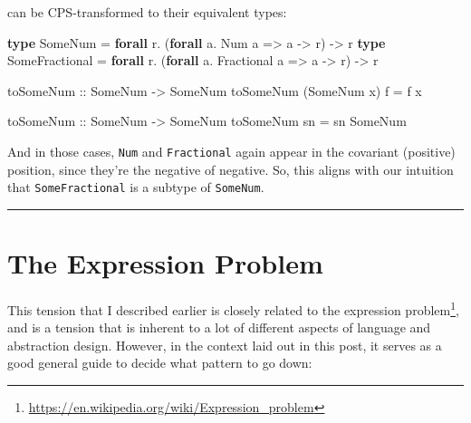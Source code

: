 \documentclass[]{article}
\newenvironment{Shaded}{}{}
\newcommand{\DataTypeTok}[1]{\textcolor[rgb]{0.56,0.13,0.00}{#1}}
\newcommand{\KeywordTok}[1]{\textcolor[rgb]{0.00,0.44,0.13}{\textbf{#1}}}
\newcommand{\NormalTok}[1]{#1}
\newcommand{\OperatorTok}[1]{\textcolor[rgb]{0.40,0.40,0.40}{#1}}
\newcommand{\OtherTok}[1]{\textcolor[rgb]{0.00,0.44,0.13}{#1}}
\renewcommand{\href}[2]{#2\footnote{\url{#1}}}
\begin{document}
can be CPS-transformed to their equivalent types:

\begin{Shaded}
\begin{Highlighting}[]
\KeywordTok{type} \DataTypeTok{SomeNum\textquotesingle{}} \OtherTok{=} \KeywordTok{forall}\NormalTok{ r}\OperatorTok{.}\NormalTok{ (}\KeywordTok{forall}\NormalTok{ a}\OperatorTok{.} \DataTypeTok{Num}\NormalTok{ a }\OtherTok{=\textgreater{}}\NormalTok{ a }\OtherTok{{-}\textgreater{}}\NormalTok{ r) }\OtherTok{{-}\textgreater{}}\NormalTok{ r}
\KeywordTok{type} \DataTypeTok{SomeFractional\textquotesingle{}} \OtherTok{=} \KeywordTok{forall}\NormalTok{ r}\OperatorTok{.}\NormalTok{ (}\KeywordTok{forall}\NormalTok{ a}\OperatorTok{.} \DataTypeTok{Fractional}\NormalTok{ a }\OtherTok{=\textgreater{}}\NormalTok{ a }\OtherTok{{-}\textgreater{}}\NormalTok{ r) }\OtherTok{{-}\textgreater{}}\NormalTok{ r}

\OtherTok{toSomeNum\textquotesingle{} ::} \DataTypeTok{SomeNum} \OtherTok{{-}\textgreater{}} \DataTypeTok{SomeNum\textquotesingle{}}
\NormalTok{toSomeNum\textquotesingle{} (}\DataTypeTok{SomeNum}\NormalTok{ x) f }\OtherTok{=}\NormalTok{ f x}

\OtherTok{toSomeNum ::} \DataTypeTok{SomeNum\textquotesingle{}} \OtherTok{{-}\textgreater{}} \DataTypeTok{SomeNum}
\NormalTok{toSomeNum sn }\OtherTok{=}\NormalTok{ sn }\DataTypeTok{SomeNum}
\end{Highlighting}
\end{Shaded}

And in those cases, \texttt{Num} and \texttt{Fractional} again appear in the
covariant (positive) position, since they're the negative of negative. So, this
aligns with our intuition that \texttt{SomeFractional} is a subtype of
\texttt{SomeNum}.

\begin{center}\rule{0.5\linewidth}{0.5pt}\end{center}

\section{The Expression Problem}\label{the-expression-problem}

This tension that I described earlier is closely related to
\href{https://en.wikipedia.org/wiki/Expression_problem}{the expression problem},
and is a tension that is inherent to a lot of different aspects of language and
abstraction design. However, in the context laid out in this post, it serves as
a good general guide to decide what pattern to go down:
\end{document}
